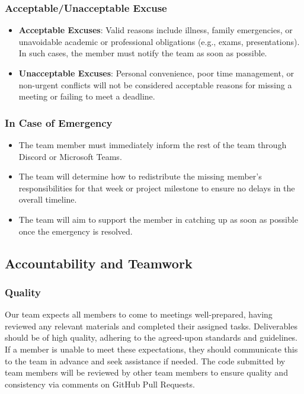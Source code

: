 \documentclass{article}
\begin{document}
\subsubsection*{Acceptable/Unacceptable Excuse}

\begin{itemize}
    \item \textbf{Acceptable Excuses}: Valid reasons include illness, family
    emergencies, or unavoidable academic or professional obligations (e.g.,
    exams, presentations). In such cases, the member must notify the team as
    soon as possible.
    \item \textbf{Unacceptable Excuses}: Personal convenience, poor time
    management, or non-urgent conflicts will not be considered acceptable
    reasons for missing a meeting or failing to meet a deadline.
\end{itemize}

\subsubsection*{In Case of Emergency}

\begin{itemize}
    \item The team member must immediately inform the rest of the team through
    Discord or Microsoft Teams.
    \item The team will determine how to redistribute the missing member's
    responsibilities for that week or project milestone to ensure no delays in
    the overall timeline.
    \item The team will aim to support the member in catching up as soon as
    possible once the emergency is resolved.
\end{itemize}

\subsection*{Accountability and Teamwork}

\subsubsection*{Quality} 

Our team expects all members to come to meetings well-prepared, having reviewed
any relevant materials and completed their assigned tasks. Deliverables should
be of high quality, adhering to the agreed-upon standards and guidelines. If a
member is unable to meet these expectations, they should communicate this to the
team in advance and seek assistance if needed. The code submitted by team
members will be reviewed by other team members to ensure quality and consistency
via comments on GitHub Pull Requests.
\end{document}
